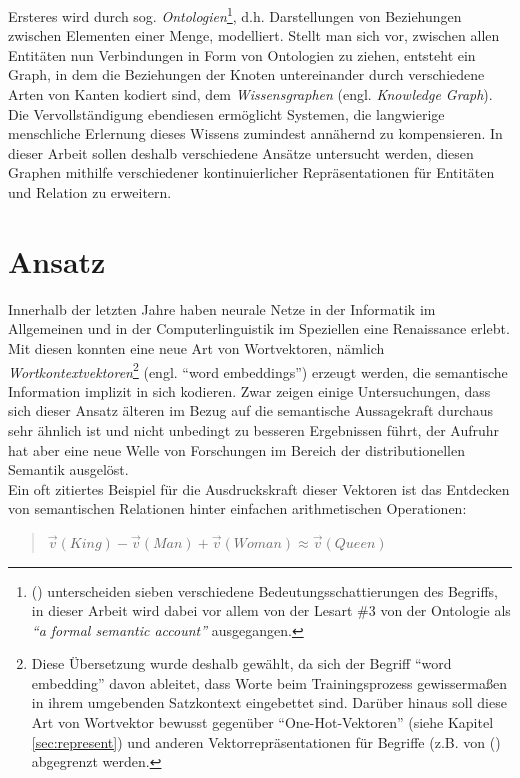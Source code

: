 Ersteres wird durch sog. \emph{Ontologien}\footnote{(\cite{giaretta1995ontologies}) unterscheiden sieben verschiedene
Bedeutungsschattierungen des Begriffs, in dieser Arbeit wird dabei vor allem von der Lesart \#3 von der Ontologie als
\emph{``a formal semantic account''} ausgegangen.}, d.h. Darstellungen von Beziehungen zwischen Elementen einer Menge, modelliert.
Stellt man sich vor, zwischen allen Entitäten nun Verbindungen in Form von Ontologien zu ziehen, entsteht ein Graph,
in dem die Beziehungen der Knoten untereinander durch verschiedene Arten von Kanten kodiert sind, dem
\emph{Wissensgraphen} (engl. \emph{Knowledge Graph}).\\
Die Vervollständigung ebendiesen ermöglicht Systemen, die langwierige menschliche Erlernung dieses Wissens zumindest
annähernd zu kompensieren. In dieser Arbeit sollen deshalb verschiedene Ansätze untersucht werden, diesen Graphen mithilfe
verschiedener kontinuierlicher Repräsentationen für Entitäten und Relation zu erweitern.

\section{Ansatz}

Innerhalb der letzten Jahre haben neurale Netze in der Informatik im Allgemeinen und in der Computerlinguistik im Speziellen
eine Renaissance erlebt. Mit diesen konnten eine neue Art von Wortvektoren, nämlich \emph{Wortkontextvektoren}\footnote{
Diese Übersetzung wurde deshalb gewählt, da sich der Begriff ``word embedding'' davon ableitet, dass Worte beim
Trainingsprozess gewissermaßen in ihrem umgebenden Satzkontext eingebettet sind. Darüber hinaus soll diese Art von Wortvektor
bewusst gegenüber ``One-Hot-Vektoren'' (siehe Kapitel \ref{sec:represent}) und anderen Vektorrepräsentationen für Begriffe
(z.B. von (\cite{bordes2013translating}) abgegrenzt werden.} (engl. ``word embeddings'') erzeugt werden,
die semantische Information implizit in sich kodieren. Zwar zeigen einige Untersuchungen, dass sich dieser Ansatz älteren
im Bezug auf die semantische Aussagekraft durchaus sehr ähnlich ist und nicht unbedingt zu besseren Ergebnissen führt,
der Aufruhr hat aber eine neue Welle von Forschungen im Bereich der distributionellen Semantik ausgelöst.\\
Ein oft zitiertes Beispiel für die Ausdruckskraft dieser Vektoren ist das Entdecken von
semantischen Relationen hinter einfachen arithmetischen Operationen:

\begin{quote}
  $\vec{v}(King) - \vec{v}(Man) + \vec{v}(Woman) \approx \vec{v}(Queen)$
\end{quote}

